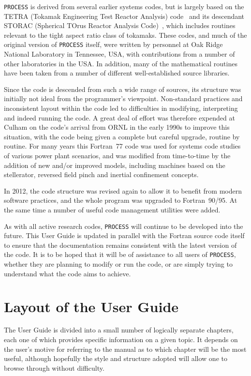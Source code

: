 \documentclass[11pt,a4paper]{report}
\newcommand{\process}{\mbox{\texttt{PROCESS}}}
\begin{document}
\process\/ is derived from several earlier systems codes, but is largely based
on the TETRA (Tokamak Engineering Test Reactor Analysis) code~\cite{tetra} and
its descendant STORAC (Spherical TOrus Reactor Analysis Code)~\cite{storac},
which includes routines relevant to the tight aspect ratio class of
tokamaks. These codes, and much of the original version of \process\/ itself,
were written by personnel at Oak Ridge National Laboratory in Tennessee, USA,
with contributions from a number of other laboratories in the USA\@. In
addition, many of the mathematical routines have been taken from a number of
different well-established source libraries.

Since the code is descended from such a wide range of sources, its structure
was initially not ideal from the programmer's viewpoint.  Non-standard
practices and inconsistent layout within the code led to difficulties in
modifying, interpreting and indeed running the code. A great deal of effort
was therefore expended at Culham on the code's arrival from ORNL in the early
1990s to improve this situation, with the code being given a complete but
careful upgrade, routine by routine. For many years this Fortran~77 code was
used for systems code studies of various power plant scenarios, and was
modified from time-to-time by the addition of new and/or improved models,
including machines based on the stellerator, reversed field pinch and inertial
confinement concepts.

In 2012, the code structure was revised again to allow it to benefit from
modern software practices, and the whole program was upgraded to
Fortran~90/95. At the same time a number of useful code management utilities
were added.

As with all active research codes, \process\/ will continue to be developed
into the future. This User Guide is updated in parallel with the Fortran
source code itself to ensure that the documentation remains consistent with
the latest version of the code. It is to be hoped that it will be of
assistance to all users of \process, whether they are planning to modify or
run the code, or are simply trying to understand what the code aims to
achieve.

\section{Layout of the User Guide}

The User Guide is divided into a small number of logically separate chapters,
each one of which provides specific information on a given topic. It depends
on the user's motive for referring to the manual as to which chapter will be
the most useful, although hopefully the style and structure adopted will allow
one to browse through without difficulty.
\end{document}

